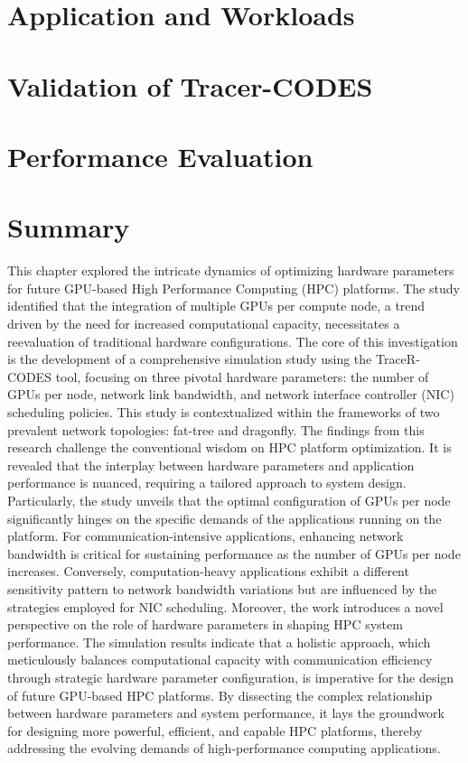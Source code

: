 

\section{Application and Workloads}


\section{Validation of Tracer-CODES}


\section{Performance Evaluation}


\section{Summary}
This chapter explored the intricate dynamics of optimizing hardware parameters for future GPU-based High Performance Computing (HPC) platforms. The study identified that the integration of multiple GPUs per compute node, a trend driven by the need for increased computational capacity, necessitates a reevaluation of traditional hardware configurations. The core of this investigation is the development of a comprehensive simulation study using the TraceR-CODES tool, focusing on three pivotal hardware parameters: the number of GPUs per node, network link bandwidth, and network interface controller (NIC) scheduling policies. This study is contextualized within the frameworks of two prevalent network topologies: fat-tree and dragonfly.
The findings from this research challenge the conventional wisdom on HPC platform optimization. It is revealed that the interplay between hardware parameters and application performance is nuanced, requiring a tailored approach to system design. Particularly, the study unveils that the optimal configuration of GPUs per node significantly hinges on the specific demands of the applications running on the platform. For communication-intensive applications, enhancing network bandwidth is critical for sustaining performance as the number of GPUs per node increases. Conversely, computation-heavy applications exhibit a different sensitivity pattern to network bandwidth variations but are influenced by the strategies employed for NIC scheduling.
Moreover, the work introduces a novel perspective on the role of hardware parameters in shaping HPC system performance. The simulation results indicate that a holistic approach, which meticulously balances computational capacity with communication efficiency through strategic hardware parameter configuration, is imperative for the design of future GPU-based HPC platforms.
By dissecting the complex relationship between hardware parameters and system performance, it lays the groundwork for designing more powerful, efficient, and capable HPC platforms, thereby addressing the evolving demands of high-performance computing applications.
